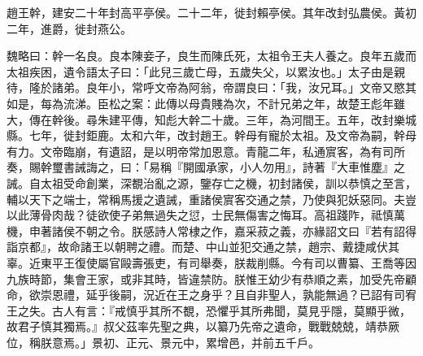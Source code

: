 
\begin{pinyinscope}
趙王幹，建安二十年封高平亭侯。二十二年，徙封賴亭侯。其年改封弘農侯。黃初二年，進爵，徙封燕公。

魏略曰：幹一名良。良本陳妾子，良生而陳氏死，太祖令王夫人養之。良年五歲而太祖疾困，遺令語太子曰：「此兒三歲亡母，五歲失父，以累汝也。」太子由是親待，隆於諸弟。良年小，常呼文帝為阿翁，帝謂良曰：「我，汝兄耳。」文帝又愍其如是，每為流涕。臣松之案：此傳以母貴賤為次，不計兄弟之年，故楚王彪年雖大，傳在幹後。尋朱建平傳，知彪大幹二十歲。三年，為河間王。五年，改封樂城縣。七年，徙封鉅鹿。太和六年，改封趙王。幹母有寵於太祖。及文帝為嗣，幹母有力。文帝臨崩，有遺詔，是以明帝常加恩意。青龍二年，私通賔客，為有司所奏，賜幹璽書誡誨之，曰：「易稱『開國承家，小人勿用』，詩著『大車惟塵』之誡。自太祖受命創業，深覩治亂之源，鑒存亡之機，初封諸侯，訓以恭慎之至言，輔以天下之端士，常稱馬援之遺誡，重諸侯賔客交通之禁，乃使與犯妖惡同。夫豈以此薄骨肉哉？徒欲使子弟無過失之愆，士民無傷害之悔耳。高祖踐阼，祗慎萬機，申著諸侯不朝之令。朕感詩人常棣之作，嘉采菽之義，亦緣詔文曰『若有詔得詣京都』，故命諸王以朝聘之禮。而楚、中山並犯交通之禁，趙宗、戴捷咸伏其辜。近東平王復使屬官毆壽張吏，有司舉奏，朕裁削縣。今有司以曹纂、王喬等因九族時節，集會王家，或非其時，皆違禁防。朕惟王幼少有恭順之素，加受先帝顧命，欲崇恩禮，延乎後嗣，況近在王之身乎？且自非聖人，孰能無過？已詔有司宥王之失。古人有言：『戒慎乎其所不覩，恐懼乎其所弗聞，莫見乎隱，莫顯乎微，故君子慎其獨焉。』叔父茲率先聖之典，以纂乃先帝之遺命，戰戰兢兢，靖恭厥位，稱朕意焉。」景初、正元、景元中，累增邑，并前五千戶。


\end{pinyinscope}